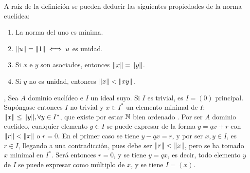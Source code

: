     \noindent A raíz de la definición se pueden deducir las siguientes propiedades de la norma euclídea:{\cite[p.~44]{Rosenberger}}
        \begin{enumerate}[label=\roman*)]
            \item La norma del uno es mínima.
            
            \item $\|u\| = \|1\| \iff u$ es unidad.
                
            \item Si $x$ e $y$ son asociados, entonces $\|x\| = \|y\|$.
        
            \item Si $y$ no es unidad, entonces $\|x\| < \|xy\|$.
        \end{enumerate}

        

\begin{prop}[Un DE es un DIP.]\label{resultado:op_cocientes}\end{prop}

\begin{dem}{\cite[p.~38]{GamboaAnillos}, \cite[p.~45]{Rosenberger}}
      Sea $A$ dominio euclídeo e $I$ un ideal suyo. Si $I$ es trivial, es $I = (0)$ principal. Supóngase entonces $I$ no trivial y $x\in I^*$ un elemento minimal de $I$: $\|x\|\leq \|y\|,\forall y\in I^*$, que existe por estar $\mathbb{N}$ bien ordenado \cite[p.~89]{LenguajePineda}. Por ser $A$ dominio euclídeo, cualquier elemento $y\in I$ se puede expresar de la forma $y = qx + r$ con $\|r\| < \|x\|$ o $r = 0$. En el primer caso se tiene $y-qx = r$, y por ser $x,y\in I$, es $r\in I$, llegando a una contradicción, pues debe ser $\|r\| < \|x\|$, pero se ha tomado $x$ minimal en $I^*$. Será entonces $r = 0$, y se tiene $y=qx$, es decir, todo elemento $y$ de $I$ se puede expresar como múltiplo de $x$, y se tiene $I = (x)$.
\end{dem}

